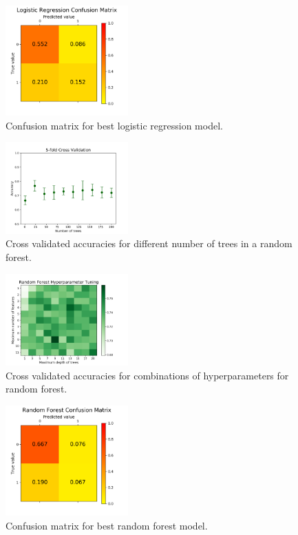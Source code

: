 \documentclass[notitlepage, reprint, nofootinbib]{revtex4-1}
\begin{document}
\begin{figure}[h!]
	\centering
	\includegraphics[width=0.42\textwidth]{../Figures/CM_LR.png}
	\caption{Confusion matrix for best logistic regression model.}
	\label{CM_LR}
\end{figure}
\begin{figure}[h!]
	\centering
	\includegraphics[width=0.42\textwidth]{../Figures/5fold_CV_RFC_ntrees.png}
	\caption{Cross validated accuracies for different number of trees in a random forest.}
	\label{CV_RFC}
\end{figure}
\newpage 
\begin{figure}[h!]
	\centering
	\includegraphics[width=0.42\textwidth]{../Figures/hyperparameter_tuning_RFC.png}
	\caption{Cross validated accuracies for combinations of hyperparameters for random forest.}
	\label{hyperparam_RFC}
\end{figure}
\begin{figure}[h!]
	\centering
	\includegraphics[width=0.42\textwidth]{../Figures/CM_RF.png}
	\caption{Confusion matrix for best random forest model.}
	\label{CM_RFC}
\end{figure}
\end{document}
